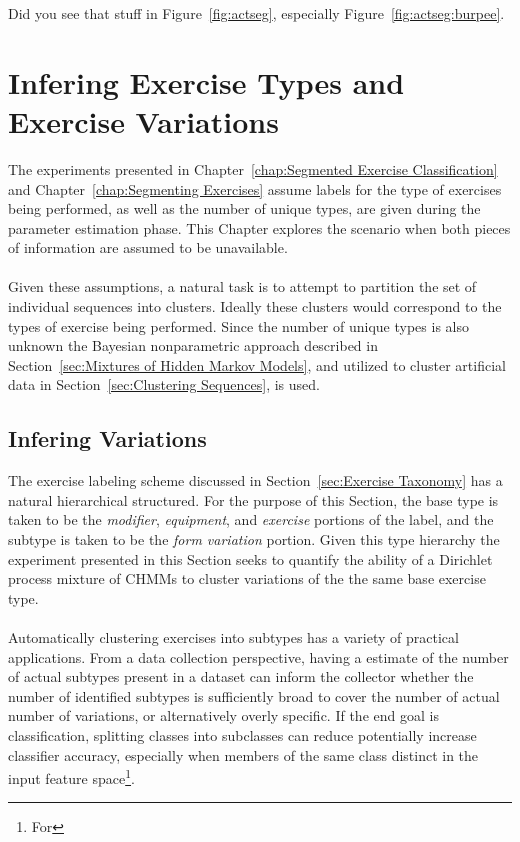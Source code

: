 \documentclass[12pt]{report}
\newcommand{\1}[0]{\mathbbm{1}}
\begin{document}
Did you see that stuff in Figure~\ref{fig:actseg}, especially Figure~\ref{fig:actseg:burpee}.

\chapter{Infering Exercise Types and Exercise Variations}
\label{sec:Infering Exercise Types and Exercise Variations}
The experiments presented in Chapter~\ref{chap:Segmented Exercise Classification}
and Chapter~\ref{chap:Segmenting Exercises} assume labels for the type of exercises
being performed, as well as the number of unique types, are given during the parameter
estimation phase. This Chapter explores the scenario when both pieces of information are
assumed to be unavailable.
\\\\
Given these assumptions, a natural task is to attempt to partition the
set of individual sequences into clusters. Ideally these clusters would
correspond to the types of exercise being performed. Since the number of
unique types is also unknown the Bayesian nonparametric approach described in
Section~\ref{sec:Mixtures of Hidden Markov Models}, and utilized to cluster
artificial data in Section~\ref{sec:Clustering Sequences}, is used.

\section{Infering Variations}
\label{sec:Infering Variations}
The exercise labeling scheme discussed in Section~\ref{sec:Exercise Taxonomy}
has a natural hierarchical structured. For the purpose of this Section, the base type
is taken to be the \emph{modifier}, \emph{equipment}, and \emph{exercise} portions
of the label, and the subtype is taken to be the \emph{form variation} portion.
Given this type hierarchy the experiment presented in this Section seeks to quantify
the ability of a Dirichlet process mixture of \acp{CHMM} to cluster variations of the
the same base exercise type.
\\\\
Automatically clustering exercises into subtypes has a variety of practical applications.
From a data collection perspective, having a estimate of the number of actual subtypes present
in a dataset can inform the collector whether the number of identified subtypes is sufficiently broad
to cover the number of actual number of variations, or alternatively overly specific.
If the end goal is classification, splitting classes into subclasses can reduce potentially
increase classifier accuracy, especially when members of the same class distinct in the input
feature space\footnote{For }.
\end{document}
